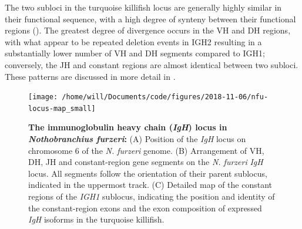 	The two subloci in the turquoise killifish locus are generally highly similar in their functional sequence, with a high degree of synteny between their functional regions (). The greatest degree of divergence occurs in the VH and DH regions, with what appear to be repeated deletion events in IGH2 resulting in a substantially lower number of VH and DH segments compared to IGH1; conversely, the JH and constant regions are almost identical between two subloci. These patterns are discussed in more detail in .
	
	
	\begin{figure}
	\centering
	\texttt{[image: /home/will/Documents/code/figures/2018-11-06/nfu-locus-map\_small]} %
			    \begin{subfigure}{0em}
        \label{fig:nfu-locus-map-a}
    \end{subfigure}
    \begin{subfigure}{0em}
        \label{fig:nfu-locus-map-b}
    \end{subfigure}
    \begin{subfigure}{0em}
        \label{fig:nfu-locus-map-c}
        \end{subfigure}
	\caption[The immunoglobulin heavy chain (\textit{IGH}) locus in \textit{Nothobranchius furzeri}]{\textbf{The immunoglobulin heavy chain (\textit{IgH}) locus in \textit{Nothobranchius furzeri}:} (A) Position of the \textit{IgH} locus on chromosome 6 of the \textit{N. furzeri} genome. (B) Arrangement of VH, DH, JH and constant-region gene segments on the \textit{N. furzeri} \textit{IgH} locus. All segments follow the orientation of their parent sublocus, indicated in the uppermost track. (C) Detailed map of the constant regions of the \textit{IGH1} sublocus, indicating the position and identity of the constant-region exons and the exon composition of expressed \textit{IgH} isoforms in the turquoise killifish.}
	\label{fig:nfu-locus-map}
	\end{figure}
	
